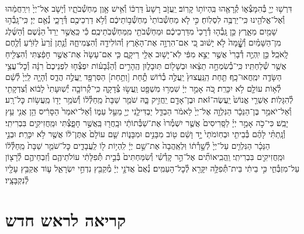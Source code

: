 \documentclass[twoside, openany, parskip=half, 11pt]{book}
\begin{document}
\begin{footnotesize}
\begin{multicols}{2}
\\
דִּרְשׁ֥וּ יְיָ֖ בְּ֯הִמָּצְ֯א֑וֹ קְ֯רָאֻ֖הוּ בִּֽהְיוֹת֥וֹ קָרֽוֹב׃ יַֽעֲזֹ֤ב רָשָׁע֙ דַּרְכּ֔וֹ וְ֯אִ֥ישׁ אָ֖וֶן מַחְשְׁ֯בֹתָ֑יו וְ֯יָשֹׁ֤ב אֶל־יְיָ֙ וִירַֽחֲמֵ֔הוּ וְ֯אֶל־אֱלֹהֵ֖ינוּ כִּֽי־יַרְבֶּ֥ה לִסְלֽוֹחַ׃ כִּ֣י לֹ֤א מַחְשְׁ֯בוֹתַי֙ מַחְשְׁ֯ב֣וֹתֵיכֶ֔ם וְ֯לֹ֥א דַרְכֵיכֶ֖ם דְּ֯רָכָ֑י נְ֯אֻ֖ם יְיָ׃ כִּֽי־גָֽבְ֯ה֥וּ שָׁמַ֖יִם מֵאָ֑רֶץ כֵּ֣ן גָּֽבְ֯ה֤וּ דְ֯רָכַי֙ מִדַּרְכֵיכֶ֔ם וּמַחְשְׁ֯בֹתַ֖י מִֽמַּחְשְׁ֯בֹֽתֵיכֶֽם׃ כִּ֡י כַּֽאֲשֶׁ֣ר יֵרֵד֩ הַגֶּ֨שֶׁם וְ֯הַשֶּׁ֜לֶג מִן־הַשָּׁמַ֗יִם וְ֯שׇׇׇׇׇׇׇׇׁ֨מָּה֙ לֹ֣א יָשׁ֔וּב כִּ֚י אִם־הִרְוָ֣ה אֶת־הָאָ֔רֶץ וְ֯הוֹלִידָ֖הּ וְ֯הִצְמִיחָ֑הּ וְ֯נָ֤תַן זֶ֨רַע֙ לַזֹּרֵ֔עַ וְ֯לֶ֖חֶם לָֽאֹכֵֽל׃ כֵּ֣ן יִֽהְיֶ֤ה דְ֯בָרִי֙ אֲשֶׁ֣ר יֵצֵ֣א מִפִּ֔י לֹֽא־יָשׁ֥וּב אֵלַ֖י רֵיקָ֑ם כִּ֤י אִם־עָשָׂה֙ אֶת־אֲשֶׁ֣ר חָפַ֔צְתִּי וְ֯הִצְלִ֖יחַ אֲשֶׁ֥ר שְׁ֯לַחְתִּֽיו׃ כִּֽי־בְ֯שִׂמְחָ֣ה תֵצֵ֔אוּ וּבְשָׁל֖וֹם תּֽוּבָל֑וּן הֶֽהָרִ֣ים וְ֯הַגְּ֯בָע֗וֹת יִפְצְ֯ח֤וּ לִפְנֵיכֶם֙ רִנָּ֔ה וְ֯כׇל־עֲצֵ֥י הַשָּׂדֶ֖ה יִמְֽחֲאוּ־כָֽף׃ תַּ֤חַת הַֽנַּֽעֲצוּץ֙ יַֽעֲלֶ֣ה בְ֯ר֔וֹשׁ תְַ֥֯חַת [וְתַ֥חַת] הַסִּרְפָּ֖ד יַֽעֲלֶ֣ה הֲדַ֑ס וְ֯הָיָ֤ה לַֽיְיָ֙ לְ֯שֵׁ֔ם לְ֯א֥וֹת עוֹלָ֖ם לֹ֥א יִכָּרֵֽת׃ כֹּ֚ה אָמַ֣ר יְיָ֔ שִׁמְר֥וּ מִשְׁפָּ֖ט וַֽעֲשׂ֣וּ צְ֯דָקָ֑ה כִּֽי־קְ֯רוֹבָ֤ה יְ֯שֽׁוּעָתִי֙ לָב֔וֹא וְ֯צִדְקָתִ֖י לְ֯הִגָּלֽוֹת׃ אַשְׁרֵ֤י אֱנוֹשׁ֙ יַֽעֲשֶׂה־זֹּ֔את וּבֶן־אָדָ֖ם יַֽחֲזִ֣יק בָּ֑הּ שֹׁמֵ֤ר שַׁבָּת֙ מֵֽחַלְּ֯ל֔וֹ וְ֯שֹׁמֵ֥ר יָד֖וֹ מֵֽעֲשׂ֥וֹת כׇּל־רָֽע׃ וְ֯אַל־יֹאמַ֣ר בֶּן־הַנֵּכָ֔ר הַנִּלְוָ֤ה אֶל־יְיָ֙ לֵאמֹ֔ר הַבְדֵּ֧ל יַבְדִּילַ֛נִי יְיָ֖ מֵעַ֣ל עַמּ֑וֹ וְ֯אַל־יֹאמַר֙ הַסָּרִ֔יס הֵ֥ן אֲנִ֖י עֵ֥ץ יָבֵֽשׁ׃ כִּי־כֹ֣ה אָמַ֣ר יְיָ֗ לַסָּֽרִיסִים֙ אֲשֶׁ֤ר יִשְׁמְ֯רוּ֙ אֶת־שַׁבְּ֯תוֹתַ֔י וּבָֽחֲר֖וּ בַּֽאֲשֶׁ֣ר חָפָ֑צְ֯תִּי וּמַֽחֲזִיקִ֖ים בִּבְרִיתִֽי׃ וְ֯נָֽתַתִּ֨י לָהֶ֜ם בְּ֯בֵיתִ֤י וּבְחֽוֹמֹתַי֙ יָ֣ד וָשֵׁ֔ם ט֖וֹב מִבָּנִ֣ים וּמִבָּנ֑וֹת שֵׁ֤ם עוֹלָם֙ אֶתֶּן־ל֔וֹ אֲשֶׁ֖ר לֹ֥א יִכָּרֵֽת׃ וּבְנֵ֣י הַנֵּכָ֗ר הַנִּלְוִ֤ים עַל־יְיָ֙ לְ֯שָׁ֣רְ֯ת֔וֹ וּֽלְאַֽהֲבָה֙ אֶת־שֵׁ֣ם יְיָ֔ לִֽהְי֥וֹת ל֖וֹ לַֽעֲבָדִ֑ים כׇּל־שֹׁמֵ֤ר שַׁבָּת֙ מֵֽחַלְּ֯ל֔וֹ וּמַֽחֲזִיקִ֖ים בִּבְרִיתִֽי׃ וַֽהֲבִֽיאוֹתִ֞ים אֶל־הַ֣ר קָדְ֯שִׁ֗י וְ֯שִׂמַּחְתִּים֙ בְּ֯בֵ֣ית תְּ֯פִלָּתִ֔י עוֹלֹתֵיהֶ֧ם וְ֯זִבְחֵיהֶ֛ם לְ֯רָצ֖וֹן עַל־מִזְבְּ֯חִ֑י כִּ֣י בֵיתִ֔י בֵּית־תְּ֯פִלָּ֥ה יִקָּרֵ֖א לְ֯כׇל־הָעַמִּֽים׃ נְ֯אֻם֙ אֲדֹנָ֣י יְיָ֔ מְ֯קַבֵּ֖ץ נִדְחֵ֣י יִשְׂרָאֵ֑ל ע֛וֹד אֲקַבֵּ֥ץ עָלָ֖יו לְ֯נִקְבָּצָֽיו׃

\end{multicols}

\section[ראש חדש]{קריאה לראש חדש}



\end{footnotesize}
\end{document}
